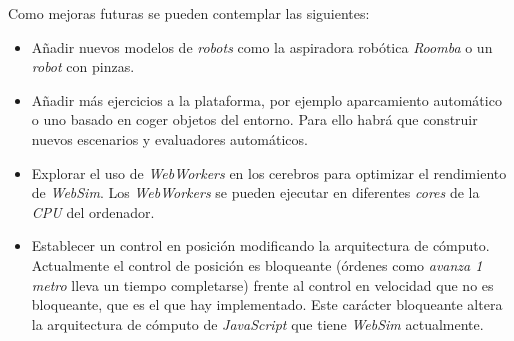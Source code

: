 Como mejoras futuras se pueden contemplar las siguientes:
\begin{itemize}
    \item Añadir nuevos modelos de \textit{robots} como la aspiradora robótica \textit{Roomba} o un \textit{robot} con pinzas. 
    \item Añadir más ejercicios a la plataforma, por ejemplo aparcamiento automático o uno basado en coger objetos del entorno. Para ello habrá que construir nuevos escenarios y evaluadores automáticos. 
    \item Explorar el uso de \textit{WebWorkers} en los cerebros para optimizar el rendimiento de \textit{WebSim}. Los \textit{WebWorkers} se pueden ejecutar en diferentes \textit{cores} de la \textit{CPU} del ordenador.
    \item Establecer un control en posición modificando la arquitectura de cómputo. Actualmente el control de posición es bloqueante (órdenes como \textit{avanza 1 metro} lleva un tiempo completarse) frente al control en velocidad que no es bloqueante, que es el que hay implementado. Este carácter bloqueante altera la arquitectura de cómputo de \textit{JavaScript} que tiene \textit{WebSim} actualmente.
\end{itemize}